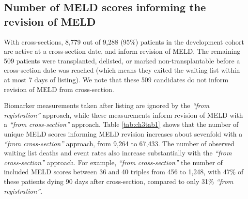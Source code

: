\documentclass[11pt,twoside,]{book}
\begin{document}
\FloatBarrier

\subsection{Number of MELD scores informing the revision of MELD}\label{number-of-meld-scores-informing-the-revision-of-meld}

With cross-sections, 8,779 out of 9,288 (95\%) patients in the
development cohort are active at a cross-section date, and inform
revision of MELD. The remaining 509 patients
were transplanted, delisted, or marked non-transplantable before a cross-section date
was reached (which means they exited the waiting list within at most 7 days of listing). We note that these 509 candidates do not inform revision of
MELD from cross-section.

Biomarker measurements taken after listing are ignored by the \emph{``from registration''} approach,
while these measurements inform revision of MELD with a \emph{``from cross-section''} approach.
Table \ref{tab:ch3tab1} shows that the number of unique MELD scores
informing MELD revision increases about sevenfold with a \emph{``from
cross-section''} approach, from 9,264 to 67,433.
The number of observed waiting list deaths and event rates also increase
substantially with the \emph{``from cross-section''} approach. For example, \emph{``from
cross-section''} the number of included MELD scores between 36 and 40
triples from 456 to 1,248, with 47\% of these patients dying 90 days
after cross-section, compared to only 31\% \emph{``from registration''}.

\begingroup
\setlength{\aboverulesep}{0.2ex}
\setlength{\belowrulesep}{0.3ex}
\end{document}
